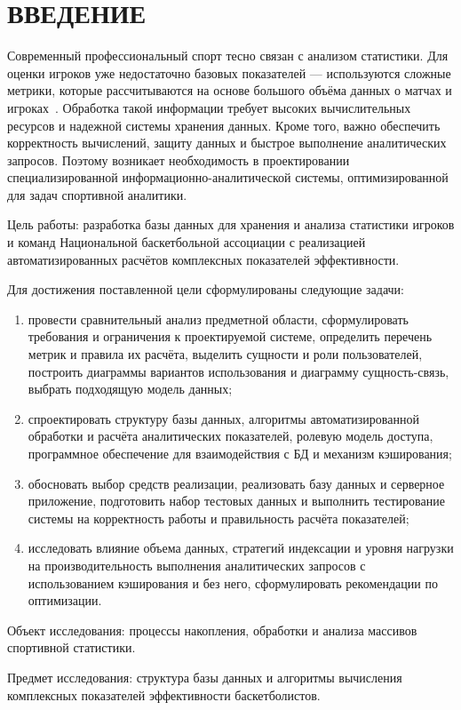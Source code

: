 \chapter*{ВВЕДЕНИЕ}

Современный профессиональный спорт тесно связан с анализом статистики. 
Для оценки игроков уже недостаточно базовых показателей --- используются
сложные метрики, которые рассчитываются на основе большого объёма данных
о матчах и игроках~\cite{kubatko}. Обработка
такой информации требует высоких вычислительных ресурсов и надежной системы хранения данных. 
Кроме того, важно обеспечить корректность вычислений, защиту данных и быстрое выполнение 
аналитических запросов. Поэтому возникает необходимость в проектировании специализированной
информационно-аналитической системы, оптимизированной для задач
спортивной аналитики.

Цель работы: разработка базы данных для хранения и анализа
статистики игроков и команд Национальной баскетбольной ассоциации
с реализацией автоматизированных расчётов комплексных показателей
эффективности.

Для достижения поставленной цели сформулированы следующие задачи:
\begin{enumerate}
    \item провести сравнительный анализ предметной области, сформулировать требования
          и ограничения к проектируемой системе, определить перечень метрик и правила
          их расчёта, выделить сущности и роли пользователей, построить диаграммы
          вариантов использования и диаграмму сущность-связь, выбрать подходящую модель данных;
    \item спроектировать структуру базы данных, алгоритмы автоматизированной обработки
          и расчёта аналитических показателей, ролевую модель доступа, программное 
          обеспечение для взаимодействия с БД и механизм кэширования;
    \item обосновать выбор средств реализации, реализовать базу данных и серверное 
          приложение, подготовить набор тестовых данных и выполнить тестирование системы 
          на корректность работы и правильность расчёта показателей;
    \item исследовать влияние объема данных, стратегий индексации и уровня нагрузки 
          на производительность выполнения аналитических запросов с использованием 
          кэширования и без него, сформулировать рекомендации по оптимизации.
\end{enumerate}

Объект исследования: процессы накопления, обработки и анализа
массивов спортивной статистики.

Предмет исследования: структура базы данных
и алгоритмы вычисления комплексных показателей эффективности баскетболистов.
